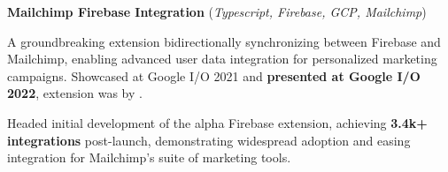 \begin{cventries}
  \cvcustombodydescription
      {\textbf{Mailchimp Firebase Integration} (\emph{Typescript, Firebase, GCP, Mailchimp})}
      {
      \begin{cvtightprose} %
        {A groundbreaking extension bidirectionally synchronizing between Firebase and Mailchimp, enabling advanced user data integration for personalized marketing campaigns. Showcased at Google I/O 2021 and \textbf{presented at Google I/O 2022}, extension was  by .}
      \end{cvtightprose}
      }
      {
      \begin{cvitems} %
        \item {Headed initial development of the alpha Firebase extension, achieving \textbf{3.4k+ integrations} post-launch, demonstrating widespread adoption and easing integration for Mailchimp’s suite of marketing tools.}
      \end{cvitems}
    }

\end{cventries}
